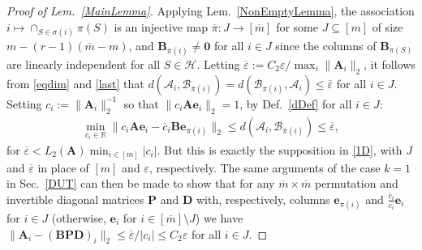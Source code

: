 \documentclass[journal, twocolumn]{IEEEtran}
\begin{document}
\begin{proof}[Proof of Lem.~\ref{MainLemma}]
Applying Lem.~\ref{NonEmptyLemma}, the association $i \mapsto \cap_{S \in \sigma(i)} \pi(S)$ is an injective map $\overline \pi: J \to [\overline m]$ for some $J \subseteq [m]$ of size $m - (r-1)(\overline m - m)$, and $\mathbf{B}_{\overline \pi(i)} \neq \mathbf{0}$ for all $i \in J$ since the columns of $\mathbf{B}_{\pi(S)}$ are linearly independent for all $S \in \mathcal{H}$. Letting $\overline \varepsilon := C_2 \varepsilon / \max_i \|\mathbf{A}_i\|_2$, it follows from \eqref{eqdim} and \eqref{last} that $d\left( \bm{\mathcal{A}}_i, \bm{\mathcal{B}}_{\overline \pi(i)} \right) = d\left(\bm{\mathcal{B}}_{\overline \pi(i)},  \bm{\mathcal{A}}_i \right)  \leq \overline \varepsilon$ for all $i \in J$. %
Setting $c_i := \|\mathbf{A}_i\|_2^{-1}$ so that $\|c_i\mathbf{Ae}_i\|_2 = 1$, by Def.~\ref{dDef} for all $i \in J$:
\begin{align*}
\min_{\overline c_i \in \mathbb{R}} \|c_i\mathbf{Ae}_i - \overline c_i \mathbf{Be}_{\overline \pi(i)} \|_2
\leq d\left( \bm{\mathcal{A}}_i, \bm{\mathcal{B}}_{\overline \pi(i)} \right)
\leq \overline \varepsilon,
\end{align*}
%
for $\overline \varepsilon < L_2(\mathbf{A})\min_{i \in [m]}|c_i|$. But this is exactly the supposition in \eqref{1D}, with $J$ and $\overline \varepsilon$ in place of $[m]$ and $\varepsilon$, respectively. The same arguments of the case $k=1$ in Sec.~\ref{DUT} can then be made to show that for any $\overline m \times \overline m$ permutation and invertible diagonal matrices $\mathbf{P}$ and $\mathbf{D}$ with, respectively, columns $\mathbf{e}_{\pi(i)}$ and $\frac{\overline{c}_i}{c_i}\mathbf{e}_i$ for $i \in J$ (otherwise, $\mathbf{e}_{i}$ for $i \in [\overline{m}] \setminus J$) we have $\|\mathbf{A}_i - (\mathbf{B}\mathbf{PD})_i \|_2 \leq \overline  \varepsilon / |c_i|  \leq C_2 \varepsilon$ for all $i \in J$.
\end{proof}
\end{document}
